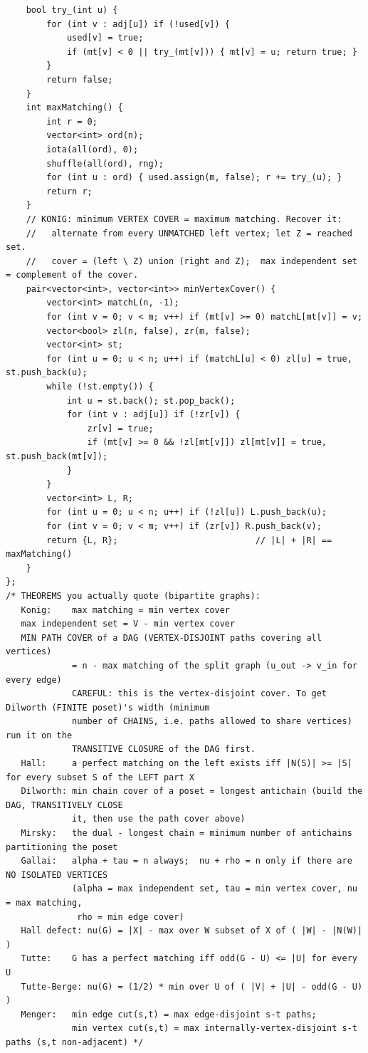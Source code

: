 \documentclass[9pt,a4paper,twocolumn]{extarticle}
\begin{document}
\begin{lstlisting}
    bool try_(int u) {
        for (int v : adj[u]) if (!used[v]) {
            used[v] = true;
            if (mt[v] < 0 || try_(mt[v])) { mt[v] = u; return true; }
        }
        return false;
    }
    int maxMatching() {
        int r = 0;
        vector<int> ord(n);
        iota(all(ord), 0);
        shuffle(all(ord), rng);
        for (int u : ord) { used.assign(m, false); r += try_(u); }
        return r;
    }
    // KONIG: minimum VERTEX COVER = maximum matching. Recover it:
    //   alternate from every UNMATCHED left vertex; let Z = reached set.
    //   cover = (left \ Z) union (right and Z);  max independent set = complement of the cover.
    pair<vector<int>, vector<int>> minVertexCover() {
        vector<int> matchL(n, -1);
        for (int v = 0; v < m; v++) if (mt[v] >= 0) matchL[mt[v]] = v;
        vector<bool> zl(n, false), zr(m, false);
        vector<int> st;
        for (int u = 0; u < n; u++) if (matchL[u] < 0) zl[u] = true, st.push_back(u);
        while (!st.empty()) {
            int u = st.back(); st.pop_back();
            for (int v : adj[u]) if (!zr[v]) {
                zr[v] = true;
                if (mt[v] >= 0 && !zl[mt[v]]) zl[mt[v]] = true, st.push_back(mt[v]);
            }
        }
        vector<int> L, R;
        for (int u = 0; u < n; u++) if (!zl[u]) L.push_back(u);
        for (int v = 0; v < m; v++) if (zr[v]) R.push_back(v);
        return {L, R};                           // |L| + |R| == maxMatching()
    }
};
/* THEOREMS you actually quote (bipartite graphs):
   Konig:    max matching = min vertex cover
   max independent set = V - min vertex cover
   MIN PATH COVER of a DAG (VERTEX-DISJOINT paths covering all vertices)
             = n - max matching of the split graph (u_out -> v_in for every edge)
             CAREFUL: this is the vertex-disjoint cover. To get Dilworth (FINITE poset)'s width (minimum
             number of CHAINS, i.e. paths allowed to share vertices) run it on the
             TRANSITIVE CLOSURE of the DAG first.
   Hall:     a perfect matching on the left exists iff |N(S)| >= |S| for every subset S of the LEFT part X
   Dilworth: min chain cover of a poset = longest antichain (build the DAG, TRANSITIVELY CLOSE
             it, then use the path cover above)
   Mirsky:   the dual - longest chain = minimum number of antichains partitioning the poset
   Gallai:   alpha + tau = n always;  nu + rho = n only if there are NO ISOLATED VERTICES
             (alpha = max independent set, tau = min vertex cover, nu = max matching,
              rho = min edge cover)
   Hall defect: nu(G) = |X| - max over W subset of X of ( |W| - |N(W)| )
   Tutte:    G has a perfect matching iff odd(G - U) <= |U| for every U
   Tutte-Berge: nu(G) = (1/2) * min over U of ( |V| + |U| - odd(G - U) )
   Menger:   min edge cut(s,t) = max edge-disjoint s-t paths;
             min vertex cut(s,t) = max internally-vertex-disjoint s-t paths (s,t non-adjacent) */
\end{lstlisting}
\end{document}
